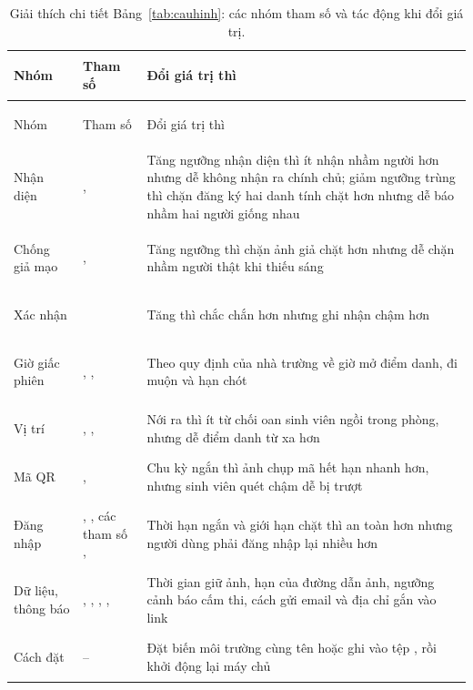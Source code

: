 {\footnotesize
\begin{xltabular}{\textwidth}{@{}>{\bfseries\raggedright\arraybackslash\leavevmode}p{2.2cm} >{\raggedright\arraybackslash\leavevmode}p{5.9cm} >{\raggedright\arraybackslash\leavevmode}X@{}}
\caption{Giải thích chi tiết Bảng~\ref{tab:cauhinh}: các nhóm tham số và tác động khi đổi giá trị.}
\label{tab:cauhinh-gt}\\
\toprule
Nhóm & Tham số & Đổi giá trị thì \\
\midrule
\endfirsthead
\toprule
Nhóm & Tham số & Đổi giá trị thì \\
\midrule
\endhead
\bottomrule
\endfoot
Nhận diện & ,  & Tăng ngưỡng nhận diện thì ít nhận nhầm người hơn nhưng dễ không nhận ra chính chủ; giảm ngưỡng trùng thì chặn đăng ký hai danh tính chặt hơn nhưng dễ báo nhầm hai người giống nhau \\
Chống giả mạo & ,  & Tăng ngưỡng thì chặn ảnh giả chặt hơn nhưng dễ chặn nhầm người thật khi thiếu sáng \\
Xác nhận &  & Tăng thì chắc chắn hơn nhưng ghi nhận chậm hơn \\
Giờ giấc phiên & , ,  & Theo quy định của nhà trường về giờ mở điểm danh, đi muộn và hạn chót \\
Vị trí & , ,  & Nới ra thì ít từ chối oan sinh viên ngồi trong phòng, nhưng dễ điểm danh từ xa hơn \\
Mã QR & ,  & Chu kỳ ngắn thì ảnh chụp mã hết hạn nhanh hơn, nhưng sinh viên quét chậm dễ bị trượt \\
Đăng nhập & , , các tham số ,  & Thời hạn ngắn và giới hạn chặt thì an toàn hơn nhưng người dùng phải đăng nhập lại nhiều hơn \\
Dữ liệu, thông báo & , , , ,  & Thời gian giữ ảnh, hạn của đường dẫn ảnh, ngưỡng cảnh báo cấm thi, cách gửi email và địa chỉ gắn vào link \\
Cách đặt & -- & Đặt biến môi trường cùng tên hoặc ghi vào tệp , rồi khởi động lại máy chủ \\
\end{xltabular}}

